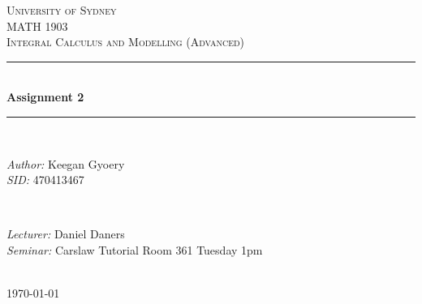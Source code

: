 \documentclass[a4paper]{article}
\begin{document}
\begin{titlepage}

\newcommand{\HRule}{\rule{\linewidth}{0.5mm}} %

\center %
 
\textsc{\LARGE University of Sydney}\\[1.5cm] %
\textsc{\Large MATH 1903}\\[0.5cm] %
\textsc{\large Integral Calculus and Modelling (Advanced)}\\[0.5cm] %

\HRule \\[0.4cm]
{ \huge \bfseries Assignment 2}\\[0.4cm] %
\HRule \\[1.5cm]

\begin{minipage}{0.4\textwidth}
\begin{flushleft} \large
\emph{Author:}
Keegan Gyoery %
\\
\emph{SID:}
470413467
\end{flushleft}
\end{minipage}
~
\begin{minipage}{0.4\textwidth}
\begin{flushright} \large
\emph{Lecturer:} 
Daniel Daners %
\\
\emph{Seminar:}
Carslaw Tutorial Room 361
Tuesday 1pm
\end{flushright}
\end{minipage}\\[4cm]

{\large \today}\\[3cm] %

\vfill %

\end{titlepage}

\end{document}
